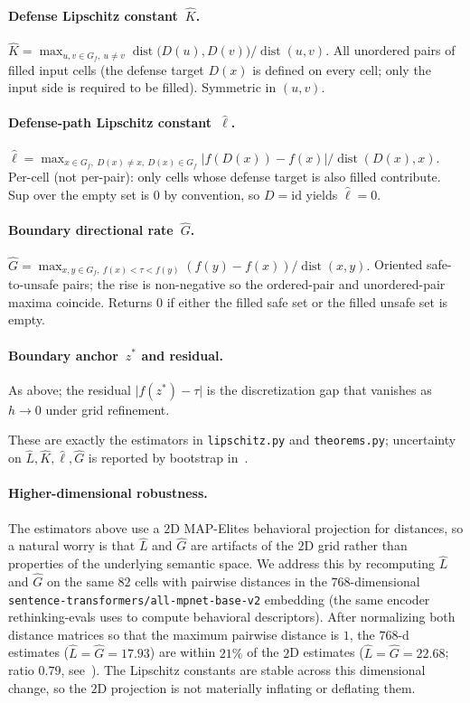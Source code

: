 \documentclass[11pt]{article}
\newcommand{\dist}{\operatorname{dist}}
\begin{document}
\paragraph{Defense Lipschitz constant~$\hat K$.}
\(
  \hat K = \max_{u, v \in G_{f},\ u \neq v}
  \dist\bigl(D(u), D(v)\bigr) / \dist(u, v).
\)
All unordered pairs of filled input cells (the defense target
$D(x)$ is defined on every cell; only the input side is required
to be filled). Symmetric in $(u, v)$.

\paragraph{Defense-path Lipschitz constant~$\hat\ell$.}
\(
  \hat\ell = \max_{x \in G_{f},\ D(x) \neq x,\ D(x) \in G_{f}}
  \lvert f(D(x)) - f(x) \rvert / \dist(D(x), x).
\)
Per-cell (not per-pair): only cells whose defense target is also
filled contribute. Sup over the empty set is $0$ by convention,
so $D = \mathrm{id}$ yields $\hat\ell = 0$.

\paragraph{Boundary directional rate~$\hat G$.}
\(
  \hat G = \max_{x, y \in G_{f},\ f(x) < \tau < f(y)}
  (f(y) - f(x)) / \dist(x, y).
\)
Oriented safe-to-unsafe pairs; the rise is non-negative so the
ordered-pair and unordered-pair maxima coincide. Returns $0$ if
either the filled safe set or the filled unsafe set is empty.

\paragraph{Boundary anchor~$z^{*}$ and residual.}
As above; the residual $\lvert f(z^{*}) - \tau \rvert$ is the
discretization gap that vanishes as $h \to 0$ under grid
refinement.

These are exactly the estimators in \texttt{lipschitz.py} and
\texttt{theorems.py}; uncertainty on $\hat L, \hat K, \hat\ell,
\hat G$ is reported by bootstrap in~.

\paragraph{Higher-dimensional robustness.}
The estimators above use a $2$D MAP-Elites behavioral projection
for distances, so a natural worry is that $\hat L$ and $\hat G$
are artifacts of the $2$D grid rather than properties of the
underlying semantic space. We address this by recomputing $\hat L$
and $\hat G$ on the same $82$ cells with pairwise distances in the
$768$-dimensional
\texttt{sentence-transformers/all-mpnet-base-v2} embedding
(the same encoder rethinking-evals uses to compute behavioral
descriptors). After normalizing both distance matrices so that the
maximum pairwise distance is $1$, the $768$-d estimates
($\hat L = \hat G = 17.93$) are within $21\%$ of the $2$D estimates
($\hat L = \hat G = 22.68$; ratio $0.79$,
see~). The Lipschitz constants are
stable across this dimensional change, so the $2$D projection is not
materially inflating or deflating them.
\end{document}
